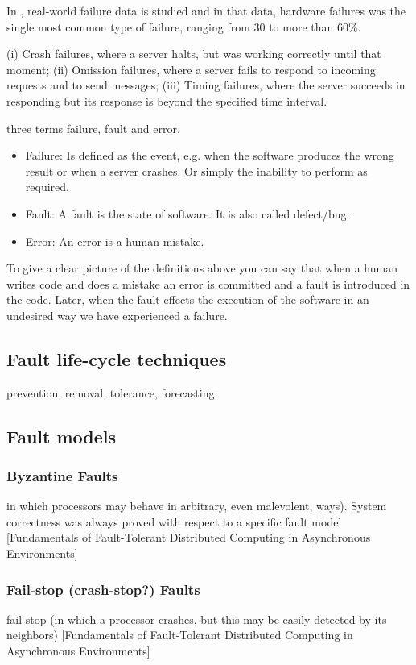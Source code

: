 \documentclass{cslthse-msc}
\begin{document}
In \cite{studyOfFailures}, real-world failure data is studied and in that data, hardware failures was the single most common type of failure, ranging from 30 to more than 60\%.

(i) Crash failures, where a server halts, but was working correctly until that moment; (ii) Omission failures, where a server fails to respond to incoming requests and to send messages; (iii) Timing failures, where the server succeeds in responding but its response is beyond the specified time interval. \cite{effTaskReplMobGrid}

three terms failure, fault and error. 
\begin{itemize}
\item Failure: Is defined as the event, e.g. when the software produces the wrong result or when a server crashes. Or simply the inability to perform as required.
\item Fault: A fault is the state of software. It is also called defect/bug.
\item Error: An error is a human mistake.
\end{itemize} 
To give a clear picture of the definitions above you can say that when a human writes code and does a mistake an error is committed and a fault is introduced in the code. Later, when the fault effects the execution of the software in an undesired way we have experienced a failure. 

\subsection{Fault life-cycle techniques}
prevention, removal, tolerance, forecasting. \cite{surveyReliabilityDistr}

\subsection{Fault models}
\subsubsection*{Byzantine Faults}
\cite{surveyFaultParallel}

in which processors may behave in arbitrary, even malevolent, ways). System correctness was always proved with respect to a specific fault model [Fundamentals of Fault-Tolerant Distributed Computing in Asynchronous Environments]

\subsubsection*{Fail-stop (crash-stop?) Faults}
\cite{surveyFaultParallel}
fail-stop (in which a processor crashes, but this may be easily detected by its neighbors) [Fundamentals of Fault-Tolerant Distributed Computing in Asynchronous Environments]
\end{document}
